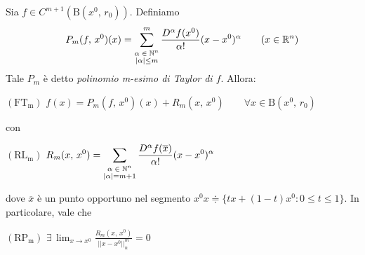 \begin{thm}
Sia $f \in C^{m+1}(\mathrm{B}(x^0,\,r_0))$. Definiamo
$$
P_m(f,\,x^0)(x) = \sum_{\overset{\text{\scriptsize $\alpha \in \mathbb{N}^n$}}{|\alpha| \leq m}}^{m} \frac{D^{\alpha} f(x^0)}{\alpha!}(x-x^0)^{\alpha}
\qquad (x \in \mathbb{R}^n)
$$
Tale $P_m$ è detto \emph{polinomio m-esimo di Taylor di $f$}. Allora:
\begin{center}
$\mathrm{(FT_m)}$
\hfill
$\displaystyle f(x) = P_m(f,\,x^0)(x)+R_m(x,\,x^0) \qquad \forall x \in \mathrm{B}(x^0,\,r_0)$
\hfill \null \\
\end{center}
con
\begin{center}
$\mathrm{(RL_m)}$
\hfill
$\displaystyle R_m(x,\,x^0) = \sum_{\overset{\text{\scriptsize $\alpha \in \mathbb{N}^n$}}{|\alpha| = m+1}} \frac{D^{\alpha} f(\overline{x})}{\alpha!}(x-x^0)^{\alpha}$
\hfill \null \\
\end{center}
dove $\overline{x}$ è un punto opportuno nel segmento $x^0x \doteqdot \lbrace tx + (1-t)x^0 : 0 \leq t \leq 1 \rbrace$. In particolare, vale che
\begin{center}
$\mathrm{(RP_m)}$
\hfill
$\displaystyle \exists \, \lim_{x \rightarrow x^0} \frac{R_m(x,\,x^0)}{||x-x^0||_n^m} = 0$
\hfill \null \\
\end{center}
\end{thm}


